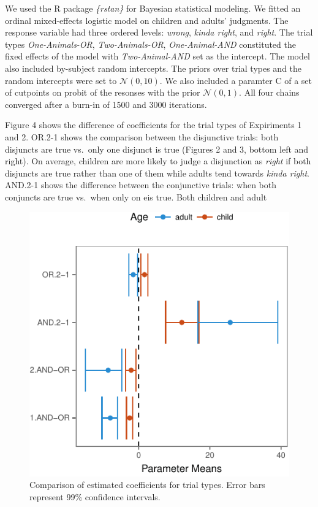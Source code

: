 \documentclass[10pt, letterpaper]{article}
\newenvironment{CodeChunk}{}{}
\begin{document}
We used the R package \emph{\{rstan\}} for Bayesian statistical
modeling. We fitted an ordinal mixed-effects logistic model on children
and adults' judgments. The response variable had three ordered levels:
\emph{wrong}, \emph{kinda right}, and \emph{right}. The trial types
\emph{One-Animals-OR}, \emph{Two-Animals-OR}, \emph{One-Animal-AND}
constituted the fixed effects of the model with \emph{Two-Animal-AND}
set as the intercept. The model also included by-subject random
intercepts. The priors over trial types and the random intercepts were
set to \(\mathcal{N}(0,10)\). We also included a paramter C of a set of
cutpoints on probit of the resonses with the prior \(\mathcal{N}(0,1)\).
All four chains converged after a burn-in of 1500 and 3000 iterations.

Figure 4 shows the difference of coefficients for the trial types of
Expiriments 1 and 2. OR.2-1 shows the comparison between the disjunctive
trials: both disjuncts are true vs.~only one disjunct is true (Figures 2
and 3, bottom left and right). On average, children are more likely to
judge a disjunction as \emph{right} if both disjuncts are true rather
than one of them while adults tend towards \emph{kinda right}. AND.2-1
shows the difference between the conjunctive trials: when both conjuncts
are true vs.~when only on eis true. Both children and adult

\begin{CodeChunk}
\begin{figure}[t]

{\centering \includegraphics{figs/model-plot-1} 

}

\caption[Comparison of estimated coefficients for trial types]{Comparison of estimated coefficients for trial types. Error bars represent 99\% confidence intervals.}\label{fig:model-plot}
\end{figure}
\end{CodeChunk}
\end{document}
